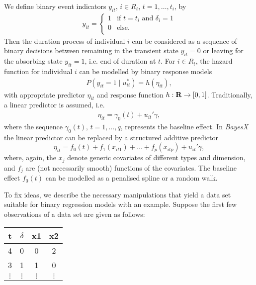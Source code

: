\documentclass[11pt,a4paper,twoside]{bayesxarticle}
\begin{document}
We define binary event indicators $y_{it}$, $i\in R_{t}$,
$t=1,\ldots,t_{i}$, by
\begin{eqnarray*}
  y_{it}=
   \left \{ \begin{array}{ll}
             1 & \mbox{if $t=t_{i}$ and $\delta_{i}=1$}\\
             0 & \mbox{else}.\\
          \end{array}   \right.
\end{eqnarray*}
Then the duration process of individual $i$ can be considered as a
sequence of binary decisions between remaining in the transient
state $y_{it}=0$ or leaving for the absorbing state $y_{it}=1$,
i.e. end of duration at $t$. For $i \in R_{t}$, the hazard
function for individual $i$ can be modelled by binary response
models
\begin{eqnarray} \label{gleichung1}
 P(y_{it}=1\mid u_{it}^*)=h(\eta_{it}),
\end{eqnarray}
with appropriate predictor $\eta_{it}$ and response function $h: {\bf R}
\rightarrow [0,1]$. Traditionally, a linear predictor is assumed,
i.e.
\begin{eqnarray} \label{gleichung2}
\eta_{it}= \gamma_{0}(t)+u_{it}' \gamma,
\end{eqnarray}
where the sequence ${\gamma_{0}(t),\, t=1,\ldots,q}$, represents the
baseline effect. In {\em BayesX} the linear predictor can be
replaced by a structured additive predictor
\begin{equation}
\label{gampred2} \eta_{it}=f_0(t) +
f_{1}(x_{it1})+\dots+f_{p}(x_{itp})+u_{it}'\gamma,
\end{equation}
where, again, the $x_j$ denote generic covariates of different types
and dimension, and $f_j$ are (not necessarily smooth) functions of
the covariates. The baseline effect $f_0(t)$ can be modelled as a
penalised spline or a random walk.

To fix ideas, we describe the necessary manipulations that yield a
data set suitable for binary regression models with an example.
Suppose the first few observations of a data set are given as
follows:

\begin{center}
\begin{tabular}{c|c|c|c}
 t & $\delta$ & x1 & x2\\\hline\hline
 4 & 0& 0 &2\\\hline
 3 & 1 &1 &0\\\hline
 $\vdots$ & $\vdots$ & $\vdots$ & $\vdots$
\end{tabular}
\end{center}
\end{document}
